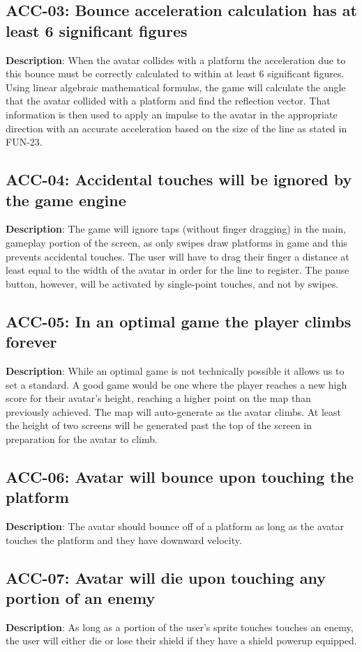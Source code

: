 \subsection{ACC-03: Bounce acceleration calculation has at least 6 significant
figures}
\textbf{Description}: When the avatar collides with a platform the acceleration
due to this bounce must be correctly calculated to within at least
6 significant figures. Using linear algebraic mathematical formulas,
the game will calculate the angle that the avatar collided with a
platform and find the reflection vector. That information is then
used to apply an impulse to the avatar in the appropriate direction
with an accurate acceleration based on the size of the line as stated
in FUN-23.
\subsection{ACC-04: Accidental touches will be ignored by the game engine}
\textbf{Description}: The game will ignore taps (without finger dragging) in
the main, gameplay portion of the screen, as only swipes draw platforms
in game and this prevents accidental touches. The user will have to
drag their finger a distance at least equal to the width of the avatar
in order for the line to register. The pause button, however, will
be activated by single-point touches, and not by swipes.
\subsection{ACC-05: In an optimal game the player climbs forever}
\textbf{Description}: While an optimal game is not technically possible it
allows us to set a standard. A good game would be one where the player
reaches a new high score for their avatar\textquoteright{}s height,
reaching a higher point on the map than previously achieved. The map
will auto-generate as the avatar climbs. At least the height of two
screens will be generated past the top of the screen in preparation
for the avatar to climb.
\subsection{ACC-06: Avatar will bounce upon touching the platform}
\textbf{Description}: The avatar should bounce off of a platform as long as
the avatar touches the platform and they have downward velocity.
\subsection{ACC-07: Avatar will die upon touching any portion of an enemy}
\textbf{Description}: As long as a portion of the user\textquoteright{}s sprite
touches touches an enemy, the user will either die or lose their shield
if they have a shield powerup equipped.
